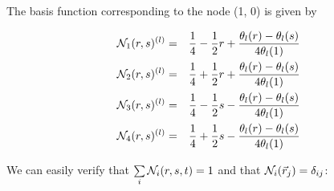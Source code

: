 The basis function corresponding to the node (1, 0) is given by
\begin{mdframed}[backgroundcolor=blue!5]
\begin{eqnarray}
{\mathcal{N}}_1(r,s)^{(l)} &=& \frac{1}{4} - \frac{1}{2} r + \frac{\theta_l(r)-\theta_l(s)}{4 \theta_l(1)}  \nonumber\\
{\mathcal{N}}_2(r,s)^{(l)} &=& \frac{1}{4} + \frac{1}{2} r + \frac{\theta_l(r)-\theta_l(s)}{4 \theta_l(1)}  \nonumber\\
{\mathcal{N}}_3(r,s)^{(l)} &=& \frac{1}{4} - \frac{1}{2} s - \frac{\theta_l(r)-\theta_l(s)}{4 \theta_l(1)}  \nonumber\\
{\mathcal{N}}_4(r,s)^{(l)} &=& \frac{1}{4} + \frac{1}{2} s - \frac{\theta_l(r)-\theta_l(s)}{4 \theta_l(1)}  
\end{eqnarray}
\end{mdframed}
We can easily verify that $\sum\limits_i {\mathcal{N}}_i(r,s,t)=1$ and that ${\mathcal{N}}_i(\vec{r}_j)=\delta_{ij}$:
